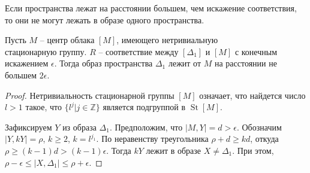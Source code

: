 \documentclass[11pt,twoside,draft
]{article}
\DeclareMathOperator{\St}{St}
\begin{document}
\begin{corollary}
  Если пространства лежат на расстоянии большем, чем
  искажение соответствия, то они не могут лежать
  в образе одного пространства.
\end{corollary}
\begin{theorem}
  Пусть $M$ -- центр облака $[M]$, имеющего нетривиальную
  \\стационарную группу. $R$ -- соответствие между $[\Delta_{1}]$ и
  $[M]$ с конечным
  искажением $\epsilon$. Тогда образ пространства $\Delta_{1}$ лежит от $M$ на
  расстоянии не большем $2\epsilon$.
  \label{thrmCenterImage}
\end{theorem}
\begin{proof}
  Нетривиальность стационарной группы $[M]$ означает, что найдется
  число $l > 1$ такое, что $\{l^{j}|j\in \mathbb{Z}\}$ является подгруппой в
  $\St{[M]}$.

  Зафиксируем $Y$ из образа $\Delta_{1}$.
  Предположим, что $|M, Y| = d > \epsilon$.  Обозначим
  $|Y, kY| = \rho$, $k \ge 2$, $k = l^{j_{1}}$. По неравенству
  треугольника $\rho + d \ge kd$,
  откуда $\rho \ge (k-1)d > (k-1)\epsilon$. Тогда $kY$ лежит в образе
  $X \ne \Delta_1$. При этом,
  $\rho - \epsilon \le |X, \Delta_1| \le \rho + \epsilon$.


\end{proof}
\end{document}
